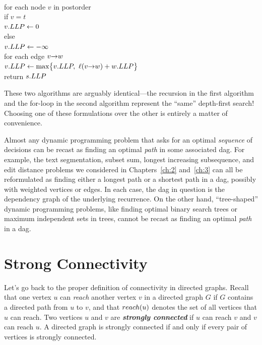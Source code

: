 \begin{pseudocode}
\\
for each node $v$ in postorder\\
\Indent if $v = t$\\
\Indent\Indent $v.LLP \gets 0$\\
\Indent else\\
\Indent\Indent $v.LLP \gets -\infty$\\
\Indent\Indent for each edge $v\mathord{\rightarrow}w$\\
\Indent\Indent\Indent $v.\Var{LLP} \gets \max\bigl\{v.\Var{LLP},\ \ell(\arc{v}{w}) + w.\Var{LLP}\bigr\}$\\
return $s.LLP$
\end{pseudocode}
These two algorithms are arguably identical---the recursion in the first algorithm and the for-loop in the second algorithm represent the “same” depth-first search!
Choosing one of these formulations over the other is entirely a matter of convenience.

Almost any dynamic programming problem that asks for an optimal \textit{sequence} of decisions can be recast as finding an optimal \textit{path} in some associated dag.
For example, the text segmentation, subset sum, longest increasing subsequence, and edit distance problems we considered in Chapters~\ref{ch:2} and~\ref{ch:3} can all be reformulated as finding either a longest path or a shortest path in a dag, possibly with weighted vertices or edges.
In each case, the dag in question is the dependency graph of the underlying recurrence.
On the other hand, “tree-shaped” dynamic programming problems, like finding optimal binary search trees or maximum independent sets in trees, cannot be recast as finding an optimal \textit{path} in a dag.

\section{Strong Connectivity}
\label{sec:6.5}

Let’s go back to the proper definition of connectivity in directed graphs.
Recall that one vertex $u$ can \textit{reach} another vertex $v$ in a directed graph $G$ if $G$ contains a directed path from $u$ to $v$, and that $reach(u)$ denotes the set of all vertices that $u$ can reach.
Two vertices $u$ and $v$ are \textbf{\textit{strongly connected}} if $u$ can reach $v$ and $v$ can reach $u$.
A directed graph is strongly connected if and only if every pair of vertices is strongly connected.

